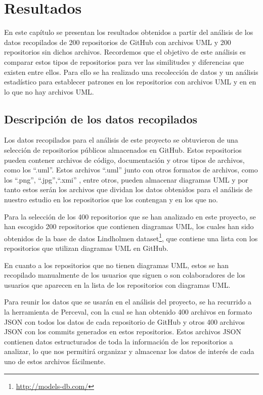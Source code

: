 \documentclass[a4paper, 12pt]{book}
\begin{document}
\cleardoublepage
\chapter{Resultados}
\label{chap:resultados}

 
En este capítulo se presentan los resultados obtenidos a partir del análisis de los datos recopilados de 200 repositorios de GitHub con archivos UML y 200 repositorios sin dichos archivos.
Recordemos que el objetivo de este análisis es comparar estos tipos de repositorios para ver las similitudes y diferencias que existen entre ellos.
Para ello se ha realizado una recolección de datos y un análisis estadístico para establecer patrones en los repositorios con archivos UML y en en lo que no hay archivos UML.


\section{Descripción de los datos recopilados}
\label{sec:descripción de los datos recopilado}

Los datos recopilados para el análisis de este proyecto se obtuvieron de una selección de repositorios públicos almacenados en GitHub. 
Estos repositorios pueden contener archivos de código, documentación y otros tipos de archivos, como los  ``.uml''.
Estos archivos ``.uml'' junto con otros formatos de archivos, como los ``.png'', ``.jpg'',``.xmi'' , entre otros, pueden almacenar diagramas UML y por tanto estos serán los archivos que dividan los datos obtenidos para el análisis de nuestro estudio en los repositorios que los contengan y en los que no.


Para la selección de los 400 repositorios que se han analizado en este proyecto, se han escogido 200 repositorios que contienen diagramas UML, los cuales han sido obtenidos de la base de datos Lindholmen dataset\footnote{\url{http://models-db.com/}}, que contiene una lista con los repositorios que utilizan diagramas UML en GitHub.


En cuanto a los repositorios que no tienen diagramas UML, estos se han recopilado manualmente de los usuarios que siguen o son colaboradores de los usuarios que aparecen en la lista de los repositorios con diagramas UML.


Para reunir los datos que se usarán en el análisis del proyecto, se ha recurrido a la herramienta de Perceval, con la cual se han obtenido 400 archivos en formato JSON con todos los datos de cada repositorio de GitHub y otros 400 archivos JSON con los commits generados en estos repositorios.
Estos archivos JSON contienen datos estructurados de toda la información de los repositorios a analizar, lo que nos permitirá organizar y almacenar los datos de interés de cada uno de estos archivos fácilmente. 
\end{document}
